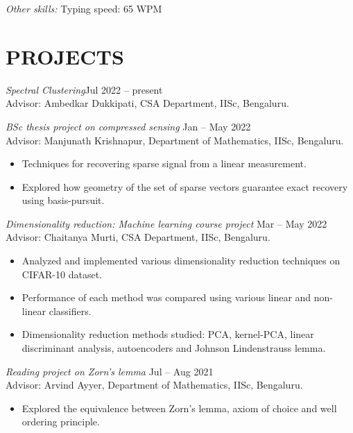 \documentclass[margin, 10pt]{res} %
\begin{document}
\begin{resume}
{\sl Other skills:} Typing speed: 65 WPM
 
 
\section{PROJECTS}
	{\sl Spectral Clustering}\hfill Jul 2022 -- present\\
	Advisor: Ambedkar Dukkipati, CSA Department, IISc, Bengaluru.

{\sl BSc thesis project on compressed sensing} \hfill  Jan -- May 2022\\
Advisor: Manjunath Krishnapur, Department of Mathematics, IISc, Bengaluru.
\begin{itemize} \itemsep -2pt
	\item Techniques for recovering sparse signal from a linear measurement.
	\item Explored how geometry of the set of sparse vectors
		guarantee exact recovery using basis-pursuit.
\end{itemize} 

\smallskip

{\sl Dimensionality reduction: Machine learning course project} \hfill Mar -- May 2022\\
	Advisor: Chaitanya Murti, CSA Department, IISc, Bengaluru.
	\begin{itemize}
		\item Analyzed and implemented various dimensionality
			reduction techniques on CIFAR-10 dataset.
		\item Performance of each method was compared using various
			linear and non-linear classifiers.
		\item Dimensionality reduction methods studied: PCA,
			kernel-PCA, linear discriminant analysis, autoencoders
			and Johnson Lindenstrauss lemma.
	\end{itemize}

\smallskip

{\sl Reading project on Zorn's lemma} \hfill Jul -- Aug 2021 \\
Advisor: Arvind Ayyer, Department of Mathematics, IISc, Bengaluru.
\begin{itemize} 
	\item Explored the equivalence between Zorn's lemma,
		axiom of choice and well ordering principle.
\end{itemize} 


\end{resume}
\end{document}

